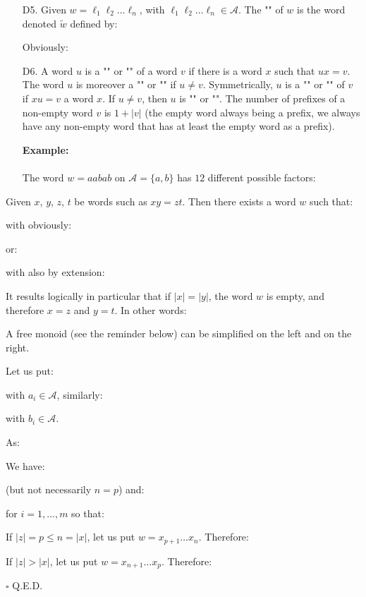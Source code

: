 \begin{enumerate}
		
		\item[D5.] Given $w=\ell_1\ell_2\ldots\ell_n$, with $\ell_1\ell_2\ldots\ell_n\in\mathcal{A}$. The "" of $w$ is the word denoted $\widetilde{w}$ defined by:
		
		Obviously:
		
		
		\item[D6.] A word $u$ is a "" or "" of a word $v$ if there is a word $x$ such that $ux=v$. The word $u$ is moreover a "" or "" if $u\neq v$. Symmetrically, $u$ is a "" or "" of $v$ if $xu=v$ a word $x$. If $u\neq v$, then $u$ is "" or "". The number of prefixes of a non-empty word $v$ is $1+|v|$ (the empty word always being a prefix, we always have any non-empty word that has at least the empty word as a prefix).
		\begin{tcolorbox}[colframe=black,colback=white,sharp corners]
		\textbf{{\Large {}}Example:}\\\\
		The word $w=aabab$ on $\mathcal{A}=\{a,b\}$ has $12$ different possible factors:
		
		\end{tcolorbox}
	\end{enumerate}
	\begin{lemma}
	Given $x$, $y$, $z$, $t$ be words such as $xy=zt$. Then there exists a word $w$ such that:
	
	with obviously:
	
	or:
	
	with also by extension:
		
	\end{lemma}
	It results logically in particular that if $|x|=|y|$, the word $w$ is empty, and therefore $x=z$ and $y=t$. In other words:
	\begin{theorem}
	A free monoid (see the reminder below) can be simplified on the left and on the right.
	\end{theorem}
	\begin{dem}
	Let us put:
	
	with $a_i\in\mathcal{A}$, similarly:
	
	with $b_i\in\mathcal{A}$.
	
	As:
	
	We have:
	
	(but not necessarily $n=p$) and:
	
	for $i=1,\ldots,m$ so that:
	
	If $|z|=p\le n=|x|$, let us put $w=x_{p+1}\ldots x_n$. Therefore:
	
	If $|z|>|x|$, let us put $w=x_{n+1}\ldots x_p$. Therefore:
	
	\begin{flushright}
		$\square$  Q.E.D.
	\end{flushright}
	\end{dem}
